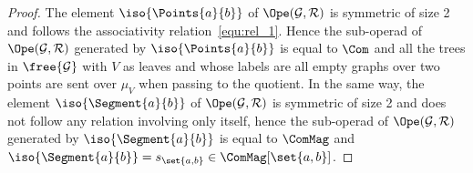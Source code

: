 \begin{proof}
    The element $\iso{\Points{a}{b}}$ of $\Ope(\mathcal{G},\mathcal{R})$ is symmetric of size 2 and follows 
    the associativity relation~\eqref{equ:rel_1}. Hence the sub-operad of $\Ope(\mathcal{G},\mathcal{R})$ 
    generated by $\iso{\Points{a}{b}}$ is equal to $\Com$ and all the trees in $\free{\mathcal{G}}$ 
    with $V$ as leaves and whose labels are all empty graphs over two points are sent over $\mu_V$ when 
    passing to the quotient. In the same way, the element $\iso{\Segment{a}{b}}$ of $\Ope(\mathcal{G},
    \mathcal{R})$ is symmetric of size 2 and does not follow any relation involving only itself, hence the 
    sub-operad of $\Ope(\mathcal{G},\mathcal{R})$ generated by $\iso{\Segment{a}{b}}$ is equal to $\ComMag$ 
    and $\iso{\Segment{a}{b}}=s_{\set{a,b}}\in\ComMag[\set{a,b}]$.


\end{proof}
